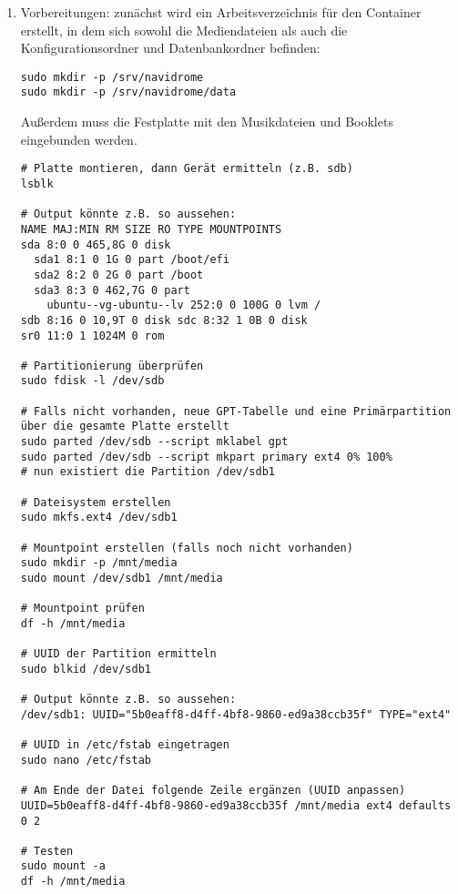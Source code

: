 \documentclass[12pt,a4paper]{report}
\begin{document}
  \begin{enumerate}
    \item Vorbereitungen:
    zunächst wird ein Arbeitsverzeichnis für den Container erstellt, 
    in dem sich sowohl die Mediendateien als auch die Konfigurationsordner und Datenbankordner befinden:

    \begin{verbatim}
sudo mkdir -p /srv/navidrome
sudo mkdir -p /srv/navidrome/data
    \end{verbatim}

    Außerdem muss die Festplatte mit den Musikdateien und Booklets eingebunden werden.
    
    \begin{verbatim}
# Platte montieren, dann Gerät ermitteln (z.B. sdb)
lsblk

# Output könnte z.B. so aussehen:
NAME MAJ:MIN RM SIZE RO TYPE MOUNTPOINTS 
sda 8:0 0 465,8G 0 disk 
  sda1 8:1 0 1G 0 part /boot/efi 
  sda2 8:2 0 2G 0 part /boot 
  sda3 8:3 0 462,7G 0 part 
    ubuntu--vg-ubuntu--lv 252:0 0 100G 0 lvm / 
sdb 8:16 0 10,9T 0 disk sdc 8:32 1 0B 0 disk 
sr0 11:0 1 1024M 0 rom

# Partitionierung überprüfen
sudo fdisk -l /dev/sdb

# Falls nicht vorhanden, neue GPT-Tabelle und eine Primärpartition über die gesamte Platte erstellt
sudo parted /dev/sdb --script mklabel gpt
sudo parted /dev/sdb --script mkpart primary ext4 0% 100%
# nun existiert die Partition /dev/sdb1

# Dateisystem erstellen
sudo mkfs.ext4 /dev/sdb1

# Mountpoint erstellen (falls noch nicht vorhanden)
sudo mkdir -p /mnt/media
sudo mount /dev/sdb1 /mnt/media

# Mountpoint prüfen
df -h /mnt/media

# UUID der Partition ermitteln
sudo blkid /dev/sdb1

# Output könnte z.B. so aussehen:
/dev/sdb1: UUID="5b0eaff8-d4ff-4bf8-9860-ed9a38ccb35f" TYPE="ext4"

# UUID in /etc/fstab eingetragen
sudo nano /etc/fstab

# Am Ende der Datei folgende Zeile ergänzen (UUID anpassen)
UUID=5b0eaff8-d4ff-4bf8-9860-ed9a38ccb35f /mnt/media ext4 defaults 0 2 

# Testen
sudo mount -a
df -h /mnt/media


\end{verbatim}
\end{enumerate}
\end{document}
